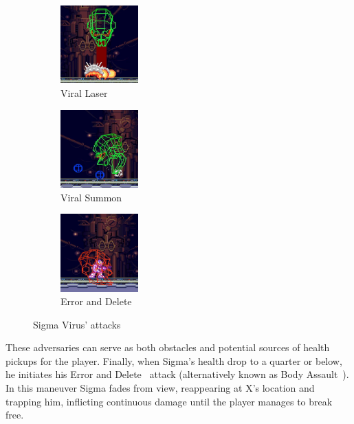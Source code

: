 \begin{figure}[htp]
	\centering
	\begin{subfigure}{0.25\linewidth}
		\centering
		\includegraphics[height=3cm]{figures/X2/Hunter_stages/Sigma_virus_laser.png}
		\caption{Viral Laser}	
	\end{subfigure}
	\begin{subfigure}{0.25\linewidth}
		\centering
		\includegraphics[height=3cm]{figures/X2/Hunter_stages/Sigma_virus_spawn.png}
		\caption{Viral Summon}
	\end{subfigure}
	\begin{subfigure}{0.25\linewidth}
		\centering
		\includegraphics[height=3cm]{figures/X2/Hunter_stages/Sigma_virus_trap.png}
		\caption{Error and Delete}
	\end{subfigure}
	\caption{Sigma Virus' attacks}
\end{figure}
 These adversaries can serve as both obstacles and potential sources of health pickups for the player. Finally, when Sigma's health drop to a quarter or below, he initiates his Error and Delete~\cite{book:MH_field_guide} attack (alternatively known as Body Assault~\cite{book:Compendium}). In this maneuver Sigma fades from view, reappearing at X's location and trapping him, inflicting continuous damage until the player manages to break free.

